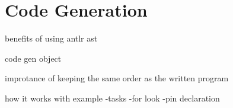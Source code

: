 \section{Code Generation}

benefits of using antlr ast

code gen object


improtance of keeping the same order as the written program

how it works with example
    -tasks
    -for look
    -pin declaration